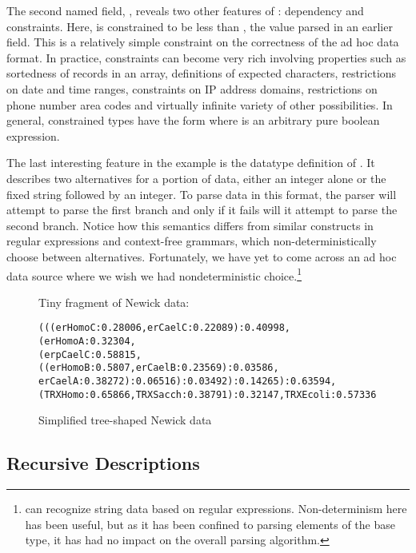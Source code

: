 The second named field, , reveals two other
features of \padsml: dependency and constraints.  Here,
 is constrained to be less than ,
the value parsed in an earlier field.  This is a relatively simple
constraint on the correctness of the ad hoc data format.  In practice,
constraints can become very rich involving properties such as
sortedness of records in an array, definitions of expected characters,
restrictions on date and time ranges, constraints on IP address
domains, restrictions on phone number area codes and virtually
infinite variety of other possibilities. In general, constrained
types have the form \cd{[x:T | e]} where  is an arbitrary pure
boolean expression.  

The last interesting feature in the \dibbler{} example is the datatype
definition of .  It describes two alternatives for a
portion of data, either an integer alone or the fixed string
 followed by an integer.  To parse data in this format,
the parser will attempt to parse the first branch and only if it fails
will it attempt to parse the second branch.  Notice how this semantics
differs from similar constructs in regular expressions and
context-free grammars, which non-deterministically choose between
alternatives.  Fortunately, we have yet to come across an ad hoc data
source where we wish we had nondeterministic choice.\footnote{\padsc{}
  can recognize string data based on regular expressions.
  Non-determinism here has been useful, but as it has been confined to
  parsing elements of the  base type, it has had no impact
  on the overall parsing algorithm.}

\begin{figure}

Tiny fragment of Newick data:

{\scriptsize
\begin{verbatim}
(((erHomoC:0.28006,erCaelC:0.22089):0.40998,(erHomoA:0.32304,
(erpCaelC:0.58815,((erHomoB:0.5807,erCaelB:0.23569):0.03586,
erCaelA:0.38272):0.06516):0.03492):0.14265):0.63594,
(TRXHomo:0.65866,TRXSacch:0.38791):0.32147,TRXEcoli:0.57336)
\end{verbatim}
}
  \caption{Simplified tree-shaped Newick data}
  \label{fig:newick}
\end{figure}

\subsection{Recursive Descriptions}

